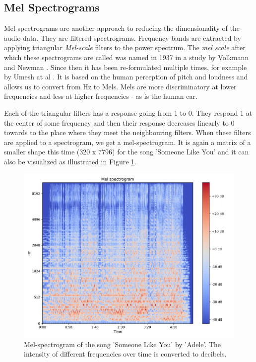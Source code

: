 \subsection{Mel Spectrograms}\label{ssec:mel_spectrograms_intro}
Mel-spectrograms are another approach to reducing the dimensionality of the audio data. They are filtered spectrograms. Frequency bands are extracted by applying triangular \textit{Mel-scale} filters to the power spectrum. The \textit{mel scale} after which these spectrograms are called was named in 1937 in a study by Volkmann and Newman \cite{1937ASAJ....8..185S}. Since then it has been re-formulated multiple times, for example by Umesh at al \cite{mel_scale_fit}. It is based on the human perception of pitch and loudness and allows us to convert from Hz to Mels. Mels are more discriminatory at lower frequencies and less at higher frequencies - as is the human ear. 

Each of the triangular filters has a response going from 1 to 0. They respond 1 at the center of some frequency and then their response decreases linearly to 0 towards to the place where they meet the neighbouring filters. When these filters are applied to a spectrogram, we get a mel-spectrogram. It is again a matrix of a smaller shape this time (320 x 7796) for the song 'Someone Like You' and it can also be visualized as illustrated in Figure \ref{fig:ilustrative_melspecrogram}.

\begin{figure}[h!]
    \centering
	\includegraphics[width=140mm]{./img/melspectrogram.png}
	\caption{Mel-spectrogram of the song 'Someone Like You' by 'Adele'. The intensity of different frequencies over time is converted to decibels.}
	\label{fig:ilustrative_melspecrogram}
\end{figure}

